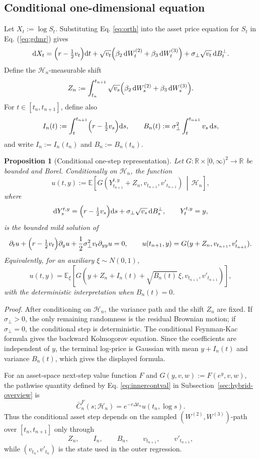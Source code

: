 \documentclass[pdflatex,sn-mathphys-num]{sn-jnl}
\theoremstyle{thmstyleone}%
\newtheorem{proposition}[theorem]{Proposition}
\theoremstyle{thmstylethree}%
\theoremstyle{thmstyletwo}%
\newcommand{\dd}{\mathrm d}
\newcommand{\E}{\mathbb E}
\newcommand{\R}{\mathbb R}
\begin{document}
\subsection{Conditional one-dimensional equation}

Let $X_t:=\log S_t$. Substituting Eq. \eqref{eq:orth} into the asset price equation for $S_t$ in Eq. (\ref{eq:gdmr}) gives
$$
\dd X_t
=\Bigl(r-\tfrac12v_t\Bigr)\dd t
+\sqrt{v_t}\Bigl(\beta_2\,\dd W_t^{(2)}
+\beta_3\,\dd W_t^{(3)}\Bigr)
+\sigma_\perp\sqrt{v_t}\,\dd B_t^\perp .
$$
Define the $\mathcal H_n$-measurable shift
$$
Z_n:=
\int_{t_n}^{t_{n+1}}
\sqrt{v_s}\Bigl(\beta_2\,\dd W_s^{(2)}+
\beta_3\,\dd W_s^{(3)}\Bigr).
$$
For $t\in[t_n,t_{n+1}]$, define also
$$
I_n(t):=\int_t^{t_{n+1}}\Bigl(r-\tfrac12v_s\Bigr)\dd s,
\qquad
B_n(t):=\sigma_\perp^2\int_t^{t_{n+1}}v_s\,\dd s,
$$
and write $I_n:=I_n(t_n)$ and $B_n:=B_n(t_n)$.

\begin{proposition}[Conditional one-step representation]\label{prop:conditional-gaussian-step}
Let $G:\R\times[0,\infty)^2\to\R$ be bounded and Borel. Conditionally on
$\mathcal H_n$, the function
$$
u(t,y)
:=
\E\!\left[
G\!\left(
Y_{t_{n+1}}^{t,y}+Z_n,
v_{t_{n+1}},
v'_{t_{n+1}}
\right)
\,\middle|\,
\mathcal H_n
\right],
$$
where
$$
\dd Y_s^{t,y}
=\Bigl(r-\tfrac12v_s\Bigr)\dd s
+\sigma_\perp\sqrt{v_s}\,\dd B_s^\perp,
\qquad
Y_t^{t,y}=y,
$$
is the bounded mild solution of
$$
\partial_tu+
\Bigl(r-\tfrac12v_t\Bigr)\partial_yu+
\frac12\sigma_\perp^2v_t\partial_{yy}u=0,
\qquad
u(t_{n+1},y)=G(y+Z_n,v_{t_{n+1}},v'_{t_{n+1}}).
$$
Equivalently, for an auxiliary $\xi\sim N(0,1)$,
\begin{equation}\label{eq:gaussian_rep}
u(t,y)
=
\E_\xi\!\left[
G\!\left(
y+Z_n+I_n(t)+\sqrt{B_n(t)}\,\xi,
v_{t_{n+1}},
v'_{t_{n+1}}
\right)
\right],
\end{equation}
with the deterministic interpretation when $B_n(t)=0$.
\end{proposition}

\noindent\textit{Proof.} After conditioning on $\mathcal H_n$, the variance
path and the shift $Z_n$ are fixed. If $\sigma_\perp>0$, the only remaining
randomness is the residual Brownian motion; if $\sigma_\perp=0$, the
conditional step is deterministic. The conditional
Feynman-Kac formula gives the backward Kolmogorov equation. Since the
coefficients are independent of $y$, the terminal log-price is Gaussian with
mean $y+I_n(t)$ and variance $B_n(t)$, which gives the displayed formula.

For an asset-space next-step value function $F$ and
$G(y,v,w):=F(e^y,v,w)$, the pathwise quantity defined by Eq. \eqref{eq:innercontval} in
Subsection~\ref{sec:hybrid-overview} is
$$
\bar C_n^F(s;\mathcal H_n)=e^{-r\Delta t_n}u(t_n,\log s).
$$
Thus the conditional asset step depends on the sampled
$(W^{(2)},W^{(3)})$-path over $[t_n,t_{n+1}]$ only through
$$
Z_n,\qquad I_n,\qquad B_n,\qquad v_{t_{n+1}},\qquad v'_{t_{n+1}},
$$
while $(v_{t_n},v'_{t_n})$ is the state used in the outer regression.
\end{document}
